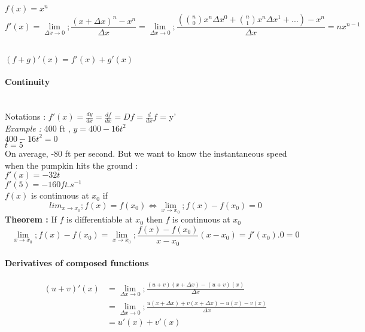 \documentclass{article}
\begin{document}
                    $f(x) = x^n$\\
                    \[f'(x) = \lim_{\Delta x \to 0}; \frac{(x + \Delta x)^n - x^n}{\Delta x} = \lim_{\Delta x \to 0}; \frac{(\binom n0 x^n \Delta x ^0 + \binom n1 x^n \Delta x ^1 +... ) - x^n}{\Delta x} = nx^{n-1} \]

                    ~\\
                    $(f+g)'(x) = f'(x)+g'(x)$


                    \paragraph{Continuity}
                        ~\\
                        Notations : $f'(x) = \frac{dy}{dx} = \frac{df}{dx} = Df = \frac{d}{dx}f$ = y'\\

                        \noindent \textit{Example : } 400 ft , $y = 400 - 16t^2$\\
                        $400 -16t^2 = 0$\\
                        $t = 5$\\
                        On average, -80 ft per second. But we want to know the instantaneous speed when the pumpkin hits the ground :\\
                        $f'(x) = -32t$\\
                        $f'(5) = -160 ft.s^{-1}$\\

                        $f(x)$ is continuous at $x_0$ if
                        \[ lim_{x \to x_0}; f(x) = f(x_0)  \Leftrightarrow \lim_{x \to x_0}; f(x) - f(x_0) = 0\]
                        \textbf{Theorem :}
                            If $f$ is differentiable at $x_0$ then $f$ is continuous at $x_0$
                            \[\lim_{x \to x_0}; f(x) - f(x_0) = \lim_{x \to x_0};\frac{f(x) - f(x_0)}{x-x_0}(x-x_0) = f'(x_0).0 = 0 \]

                    \paragraph{Derivatives of composed functions}

                        \begin{align*} (u+v)'(x) &= \lim_{\Delta x \to 0}; \frac{(u+v)(x+\Delta x) - (u +v)(x)}{\Delta x}\\
                        &= \lim_{\Delta x \to 0}; \frac{u(x+\Delta x) + v(x+\Delta x) - u(x) - v(x)}{\Delta x}\\
                        &= u'(x) + v'(x)
                        \end{align*}
\end{document}
